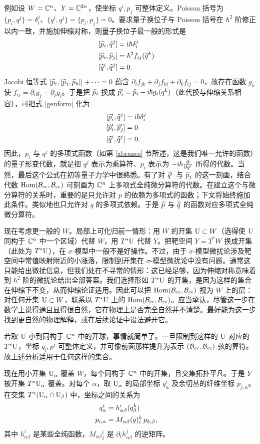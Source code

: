 例如设 $W={\mathbb C}^n$、$Y={\mathbb C}^{2n}$，使坐标 $q^i,p_j$ 可整体定义。Poisson 括号为 $\{p_i,q^j\}=\delta_i^j$、$\{q^i,q^j\}=\{p_i,p_j\}=0$。要求量子换位子与 Poisson 括号在 $\hbar^2$ 阶修正以内一致，并施加伸缩对称，则量子换位子最一般的形式是
\begin{align}\label{genform}
[\widehat p_i,\widehat q^j]&={\mathrm i}\hbar\delta^j_i\cr
[\widehat p_i,\widehat p_j]&=\hbar^2f_{ij}(\widehat q^k)\cr
[\widehat q^i,\widehat q^j]&=0.\end{align}
Jacobi 恒等式 $[\widehat p_i,[\widehat p_j,\widehat p_k]]+\cdots=0$ 蕴含 $\partial_if_{jk}+\partial_jf_{ki}+\partial_kf_{ij}=0$，故存在函数 $g_k$ 使 $f_{ij}=\partial_ig_j-\partial_jg_i$。于是把 $\widehat p_i$ 换成 $\widehat p_i'=\widehat p_i-{\mathrm i}\hbar g_i(q^k)$（此代换与伸缩关系相容），可把式 \eqref{genform} 化为
\begin{align}\label{genformtwo}
[\widehat p_i',\widehat q^j]&={\mathrm i}\hbar\delta^j_i\cr
[\widehat p_i',\widehat p_j']&=0\cr
[\widehat q^i,\widehat q^j]&=0.\end{align}
因此，$p_i$ 与 $q^j$ 的多项式函数（如第 \ref{abranes} 节所述，这是我们唯一允许的函数）的量子形变代数，就是把 $q^j$ 表示为乘算符、$p_i$ 表示为 $-{\mathrm i}\hbar\frac{\partial}{\partial q^i}$ 所得的代数。当然，最后这个公式在初等量子力学中很熟悉。有了对 $\widehat q^i$ 与 $\widehat p_j$ 的这一刻画，结合代数 ${\mathrm{Hom}}({\mathcal B}_{\mathrm{cc}},{\mathcal B}_{\mathrm{cc}})$ 可刻画为 ${\mathbb C}^n$ 上多项式全纯微分算符的代数。在建立这个与微分算符的关系时，重要的是只允许对 $p$ 的依赖为多项式的函数；下文将始终施加此条件。类似地也只允许对 $q$ 的多项式依赖。于是 $\widehat p$ 与 $\widehat q$ 的函数对应多项式全纯微分算符。

现在考虑更一般的 $W$。局部上可化归前一情形：用 $W$ 的开集 ${\mathrm U}\subset W$（选得使 ${\mathrm U}$ 同构于 ${\mathbb C}^n$ 中一个区域）代替 $W$，用 $T^*{\mathrm U}$ 代替 $Y$。把靶空间 $Y=T^*W$ 换成开集（此处为 $T^*{\mathrm U}$），在 $\sigma$-模型中一般不是好操作。不过，由于 $\sigma$-模型微扰论涉及靶空间中常值映射附近的小涨落，限制到开集在 $\sigma$-模型微扰论中没有问题。通常这只能给出微扰信息，但我们处在不寻常的情形：这已经足够，因为伸缩对称意味着到 $\hbar^2$ 阶的微扰论给出全部答案。我们选择形如 $T^*{\mathrm U}$ 的开集，是因为这样的集合在伸缩下不变，从而伸缩论证适用。因此可以把 ${\mathrm{Hom}}({\mathcal B}_{\mathrm{cc}},{\mathcal B}_{\mathrm{cc}})$ 视为 $W$ 上的层：对任何开集 ${\mathrm U}\subset W$，联系以 $T^*{\mathrm U}$ 上的 ${\mathrm{Hom}}({\mathcal B}_{\mathrm{cc}},{\mathcal B}_{\mathrm{cc}})$。应当承认，尽管这一步在数学上说得通且显得很自然，它在物理上是否完全自然并不清楚。最好能为这一步找到更自然的物理解释，或在后续论证中设法避开它。

若取 ${\mathrm U}$ 小到同构于 ${\mathbb C}^n$ 中的开球，事情就简单了。一旦限制到这样的 ${\mathrm U}$ 对应的 $T^*{\mathrm U}$，坐标 $q_i,p^j$ 可整体定义，并可像前面那样提升为表示 $({\mathcal B}_{\mathrm{cc}},{\mathcal B}_{\mathrm{cc}})$ 弦的算符。故上述分析适用于任何这样的集合。

现在用小开集 ${\mathrm U}_\alpha$ 覆盖 $W$，每个同构于 ${\mathbb C}^n$ 中的开集，且交集拓扑平凡。于是 $Y$ 被开集 $T^*{\mathrm U}_\alpha$ 覆盖。对每个 $\alpha$，取 ${\mathrm U}_\alpha$ 的局部坐标 $q^i_\alpha$ 及余切丛的纤维坐标 $p_{j,\alpha}$。在交集 $T^*({\mathrm U}_\alpha\cap{\mathrm U}_\beta)$ 中，坐标之间的关系为
\begin{align}\label{relco}
q^i_\alpha&=h^i_{\alpha\beta}(q^k_\beta)\cr
p_{i,\alpha}&=M_{\alpha\beta}(q)^k_i\,p_{k,\beta},\end{align}
其中 $h^i_{\alpha\beta}$ 是某些全纯函数，$M_{\alpha\beta}{}^i_j$ 是 $\partial_ih^j_{\alpha\beta}$ 的逆矩阵。

